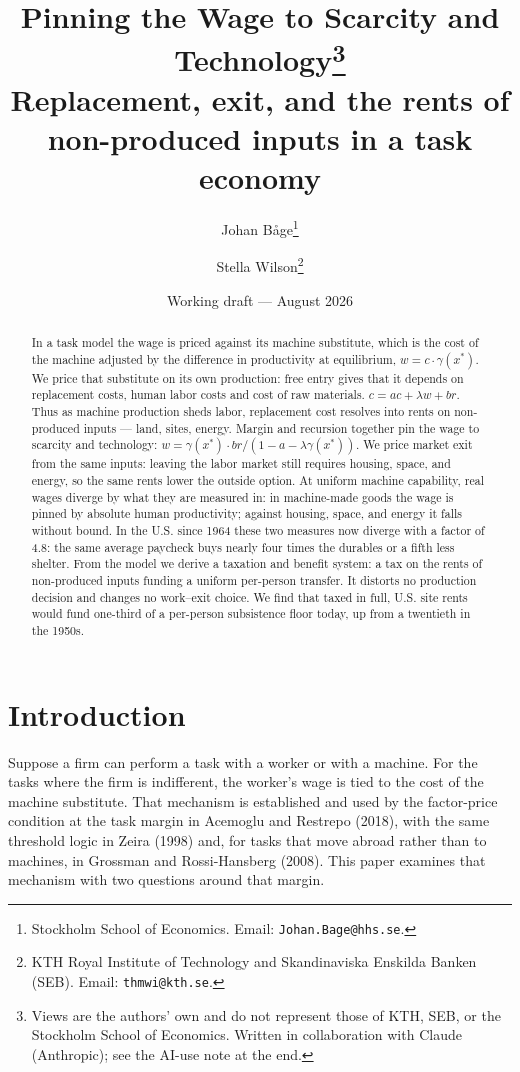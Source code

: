 \documentclass[12pt]{article}
\title{\bfseries Pinning the Wage to Scarcity and Technology\thanks{Views are the
  authors' own and do not represent those of KTH, SEB, or the Stockholm School of
  Economics. Written in collaboration with Claude (Anthropic); see the AI-use note
  at the end.
  }\\[7pt]
  \large\mdseries Replacement, exit, and the rents of non-produced inputs in a task economy}
\author{
  Johan B\r{a}ge\thanks{Stockholm School of Economics.
    Email: \texttt{Johan.Bage@hhs.se}.
  }
  \and
  Stella Wilson\thanks{KTH Royal Institute of Technology and Skandinaviska
    Enskilda Banken (SEB). Email: \texttt{thmwi@kth.se}.}
}
\date{Working draft --- August 2026}
\theoremstyle{plain}
\begin{document}
\maketitle

\begin{abstract}
\noindent In a task model the wage is priced against its machine substitute, which is the cost of the machine adjusted by the difference in productivity at equilibrium, $w = c\cdot \gamma (x^*)$. We price that substitute on its own production: free entry gives that it depends on replacement costs, human labor costs and cost of raw materials. $c = ac + \lambda w + br$. Thus as machine production sheds labor, replacement cost resolves into rents on non-produced inputs --- land, sites, energy. Margin and recursion together pin the wage to scarcity and technology: $w = \gamma (x^*)\cdot br/(1 - a - \lambda \gamma (x^*))$. We price market exit from the same inputs: leaving the labor market still requires housing, space, and energy, so the same rents lower the outside option. At uniform machine capability, real wages diverge by what they are measured in: in machine-made goods the wage is pinned by absolute human productivity; against housing, space, and energy it falls without bound. In the U.S. since 1964 these two measures now diverge with a factor of 4.8: the same average paycheck buys nearly four times the durables or a fifth less shelter. From the model we derive a taxation and benefit system: a tax on the rents of non-produced inputs funding a uniform per-person transfer. It distorts no production decision and changes no work--exit choice. We find that taxed in full, U.S. site rents would fund one-third of a per-person subsistence floor today, up from a twentieth in the 1950s.
\end{abstract}

\section{Introduction}\label{sec:intro}

Suppose a firm can perform a task with a worker or with a machine. For the tasks where the firm is indifferent, the worker's wage is tied to the cost of the machine substitute. That mechanism is established and used by the factor-price condition at the task margin in Acemoglu and Restrepo (2018), with the same threshold logic in Zeira (1998) and, for tasks that move abroad rather than to machines, in Grossman and Rossi-Hansberg (2008). This paper examines that mechanism with two questions around that margin.
\end{document}
